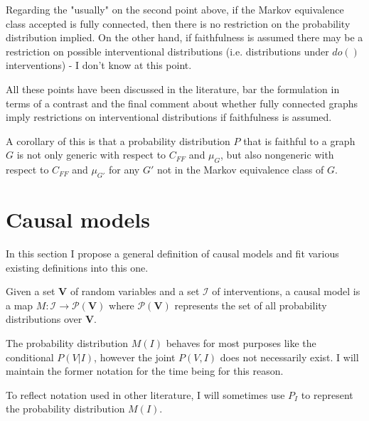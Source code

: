 Regarding the "usually" on the second point above, if the Markov equivalence class accepted is fully connected, then there is no restriction on the probability distribution implied. On the other hand, if faithfulness is assumed there may be a restriction on possible interventional distributions (i.e. distributions under $do()$ interventions) - I don't know at this point.

All these points have been discussed in the literature, bar the formulation in terms of a contrast and the final comment about whether fully connected graphs imply restrictions on interventional distributions if faithfulness is assumed.

\begin{remark}
A corollary of this is that a probability distribution $P$ that is faithful to a graph $G$ is not only generic with respect to $C_{FF}$ and $\mu_G$, but also nongeneric with respect to $C_{FF}$ and $\mu_{G'}$ for any $G'$ not in the Markov equivalence class of $G$.
\end{remark}



\section{Causal models}

In this section I propose a general definition of causal models and fit various existing definitions into this one.

\begin{definition}\label{def:causal_models}
Given a set $\mathbf{V}$ of random variables and a set $\mathcal{I}$ of interventions, a causal model is a map $M:\mathcal{I}\to \mathcal{P}(\mathbf{V})$ where $\mathcal{P}(\mathbf{V})$ represents the set of all probability distributions over $\mathbf{V}$.

The probability distribution $M(I)$ behaves for most purposes like the conditional $P(V|I)$, however the joint $P(V,I)$ does not necessarily exist. I will maintain the former notation for the time being for this reason.

To reflect notation used in other literature, I will sometimes use $P_I$ to represent the probability distribution $M(I)$.
\end{definition}

